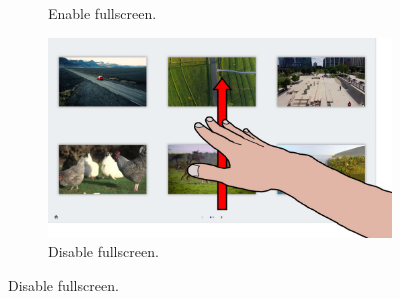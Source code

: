 \begin{figure}[ht]
\begin{subfigure}{.24\textwidth}
        \vspace{-6pt}
        \captionsetup{width=.99\linewidth}
        \caption{Enable fullscreen.}
        \label{fig:lui:gestures:fullscreen-on}
    \end{subfigure}
    \begin{subfigure}{.24\textwidth}
        \centering
        \includegraphics[width=.97\linewidth]{Figures/LUI/Gestures/flick_up.pdf} 
        \vspace{-6pt}
        \captionsetup{width=.99\linewidth}
        \caption{Disable fullscreen.}
        \label{fig:lui:gestures:fullscreen-off}
    \end{subfigure}
    

\end{figure}
